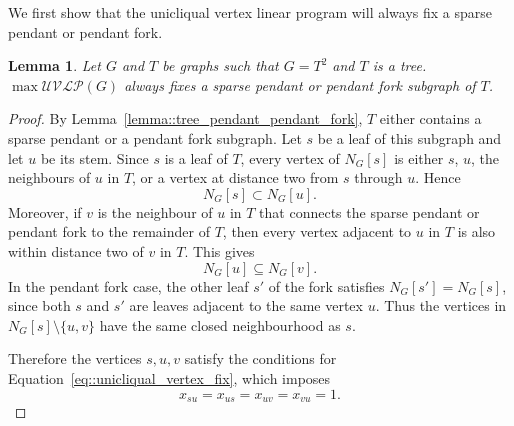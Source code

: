 \documentclass[11pt]{article}
\newtheorem{lemma}{Lemma}
\begin{document}


We first show that the unicliqual vertex linear program will always fix a sparse pendant or pendant fork. 

\begin{lemma} \label{lemma::unicliqual_vertex_fix}
  Let $G$ and $T$ be graphs such that $G = T^2$ and $T$ is a tree. $\max\mathcal{UVLP}(G)$ always fixes a sparse pendant or pendant fork subgraph of $T$.
\end{lemma}
\begin{proof}
  By Lemma~\ref{lemma::tree_pendant_pendant_fork}, $T$ either contains a sparse pendant or a pendant fork subgraph. Let $s$ be a leaf of this subgraph and let $u$ be its stem. Since $s$ is a leaf of $T$, every vertex of  $N_G[s]$ is either $s$, $u$, the neighbours of $u$ in $T$, or a vertex at distance two from $s$ through $u$. Hence
  \[
  N_G[s] \subset N_G[u].
  \]
  Moreover, if $v$ is the neighbour of $u$ in $T$ that connects the sparse pendant or pendant fork to the remainder of $T$, then every vertex adjacent to $u$ in $T$ is also within distance two of $v$ in $T$.
  This gives 
  \[
  N_G[u] \subseteq N_G[v].
  \]
  In the pendant fork case, the other leaf $s'$ of the fork satisfies $N_G[s']=N_G[s]$, since both $s$ and $s'$ are leaves adjacent to the same vertex $u$. Thus the vertices in $N_G[s]\setminus\{u,v\}$ have the same closed neighbourhood as $s$.

  Therefore the vertices $s,u,v$ satisfy the conditions for  Equation~\eqref{eq::unicliqual_vertex_fix}, which imposes
  \[
  x_{su}=x_{us}=x_{uv}=x_{vu}=1.
  \]
\end{proof}
\end{document}

